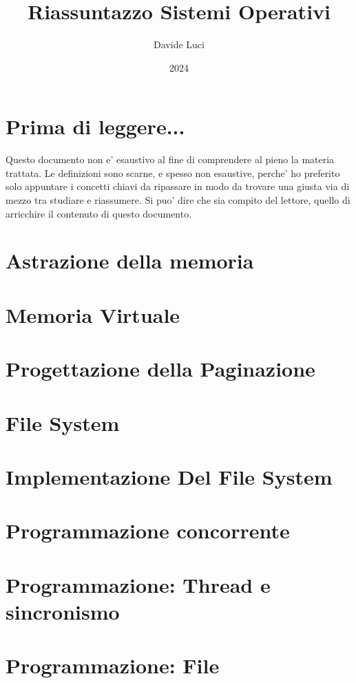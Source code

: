 \documentclass{article}
\title{Riassuntazzo Sistemi Operativi}
\author{Davide Luci}
\date{2024}
\begin{document}
    \maketitle
    \tableofcontents
    \newpage


    \setlength{\parindent}{0pt}
    \section{ Prima di leggere...}
    Questo documento non e' esaustivo al fine di comprendere al pieno la materia trattata.
    Le definizioni sono scarne, e spesso non esaustive, perche' ho preferito solo appuntare i concetti chiavi
    da ripassare in modo da trovare una giusta via di mezzo tra studiare e riassumere. Si puo' dire che sia compito del 
    lettore, quello di arricchire il contenuto di questo documento.

    \section {Astrazione della memoria}
        
    \section {Memoria Virtuale}
        
    \section {Progettazione della Paginazione}
        

    \newpage
    \section {File System}
        
        
    \newpage
    \section {Implementazione Del File System}
        

    
    \newpage
    \section {Programmazione concorrente}
        
    \section {Programmazione: Thread e sincronismo}
        
    \section {Programmazione: File}
        
    
\end{document}
